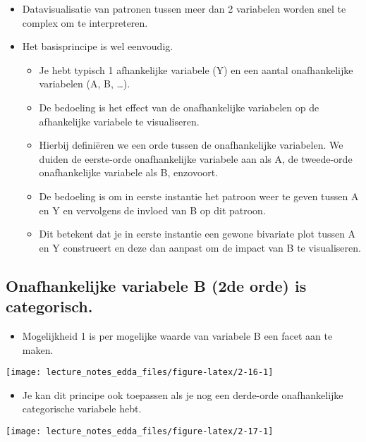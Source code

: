 \documentclass[]{memoir}
\providecommand{\tightlist}{%
  \setlength{\itemsep}{0pt}\setlength{\parskip}{0pt}}
\begin{document}
\begin{itemize}
\tightlist
\item
  Datavisualisatie van patronen tussen meer dan 2 variabelen worden snel
  te complex om te interpreteren.
\item
  Het basisprincipe is wel eenvoudig.

  \begin{itemize}
  \tightlist
  \item
    Je hebt typisch 1 afhankelijke variabele (Y) en een aantal
    onafhankelijke variabelen (A, B, \ldots{}).
  \item
    De bedoeling is het effect van de onafhankelijke variabelen op de
    afhankelijke variabele te visualiseren.
  \item
    Hierbij definiëren we een orde tussen de onafhankelijke variabelen.
    We duiden de eerste-orde onafhankelijke variabele aan als A, de
    tweede-orde onafhankelijke variabele als B, enzovoort.
  \item
    De bedoeling is om in eerste instantie het patroon weer te geven
    tussen A en Y en vervolgens de invloed van B op dit patroon.
  \item
    Dit betekent dat je in eerste instantie een gewone bivariate plot
    tussen A en Y construeert en deze dan aanpast om de impact van B te
    visualiseren.
  \end{itemize}
\end{itemize}

\subsection{Onafhankelijke variabele B (2de orde) is
categorisch.}\label{onafhankelijke-variabele-b-2de-orde-is-categorisch.}

\begin{itemize}
\tightlist
\item
  Mogelijkheid 1 is per mogelijke waarde van variabele B een facet aan
  te maken.
\end{itemize}

\texttt{[image: lecture\_notes\_edda\_files/figure-latex/2-16-1]}

\begin{itemize}
\tightlist
\item
  Je kan dit principe ook toepassen als je nog een derde-orde
  onafhankelijke categorische variabele hebt.
\end{itemize}

\texttt{[image: lecture\_notes\_edda\_files/figure-latex/2-17-1]}
\end{document}
